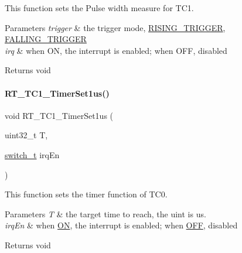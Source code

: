 This function sets the Pulse width measure for T\+C1. 


\begin{DoxyParams}{Parameters}
{\em trigger} & the trigger mode, \mbox{\hyperlink{a00020_a6d33f21be3f0c5cf91c5d638e8aca086a60a109ab1ab372f4e3935064a3f0a26c}{R\+I\+S\+I\+N\+G\+\_\+\+T\+R\+I\+G\+G\+ER}}, \mbox{\hyperlink{a00020_a6d33f21be3f0c5cf91c5d638e8aca086a75134708fc2093222ca5a56acefc5d3f}{F\+A\+L\+L\+I\+N\+G\+\_\+\+T\+R\+I\+G\+G\+ER}} \\
\hline
{\em irq} & when ON, the interrupt is enabled; when O\+FF, disabled \\
\hline
\end{DoxyParams}
\begin{DoxyReturn}{Returns}
void 
\end{DoxyReturn}
\mbox{\label{a00044_a88f5b0594e9e1006860ebde0dc13c148}} 
\paragraph{\texorpdfstring{R\+T\+\_\+\+T\+C1\+\_\+\+Timer\+Set1us()}{RT\_TC1\_TimerSet1us()}}
{\footnotesize\ttfamily void R\+T\+\_\+\+T\+C1\+\_\+\+Timer\+Set1us (\begin{DoxyParamCaption}\item[{uint32\+\_\+t}]{T,  }\item[{\mbox{\hyperlink{a00020_ab43e533f3793920486fb81c580f71564}{switch\+\_\+t}}}]{irq\+En }\end{DoxyParamCaption})\hspace{0.3cm}{\ttfamily [inline]}}



This function sets the timer function of T\+C0. 


\begin{DoxyParams}{Parameters}
{\em T} & the target time to reach, the uint is us. \\
\hline
{\em irq\+En} & when \mbox{\hyperlink{a00020_ab43e533f3793920486fb81c580f71564a977d478dacaae531f95695750d1e9d03}{ON}}, the interrupt is enabled; when \mbox{\hyperlink{a00020_ab43e533f3793920486fb81c580f71564aac132f2982b98bcaa3445e535a03ff75}{O\+FF}}, disabled \\
\hline
\end{DoxyParams}
\begin{DoxyReturn}{Returns}
void 
\end{DoxyReturn}
